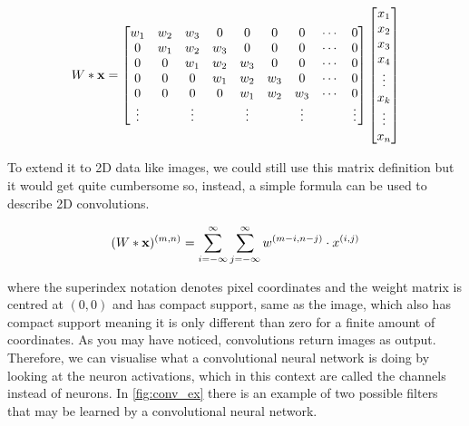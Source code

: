 \begin{equation}
    W * {\mathbf x} = \begin{bmatrix}
        w_1 & w_2  & w_3  & 0 & 0 & 0 & 0&\cdots  &0\\
        0 & w_1  & w_2 & w_3  & 0&0&0&\cdots &0\\
        0 & 0 & w_1 & w_2  & w_3  & 0&0&\cdots &0\\
        0 & 0 & 0& w_1  & w_2  &w_3 &0&\cdots &0\\
        0 & 0 & 0& 0 & w_1  &w_2 &w_3 &\cdots &0\\
        \vdots&&\vdots&&\vdots&&\vdots&&\vdots
    \end{bmatrix}
    \begin{bmatrix}
        x_1\\
        x_2\\
        x_3\\
        x_4\\
        \vdots\\
        x_k\\
        \vdots\\
        x_n
    \end{bmatrix}
\end{equation}

To extend it to 2D data like images, we could still use this matrix definition but it would get quite cumbersome so, instead, a simple formula can be used to describe 2D convolutions.

\begin{equation}
    (W * {\mathbf x}) ^{(m,n)} = \sum_{i=-\infty}^{\infty} \sum_{j=-\infty}^{\infty} w^{(m-i, n-j)} \cdot x^{(i,j)}
\end{equation}

\noindent where the superindex notation denotes pixel coordinates and the weight matrix is centred at $(0,0)$ and has compact support, same as the image, which also has compact support meaning it is only different than zero for a finite amount of coordinates. As you may have noticed, convolutions return images as output. Therefore, we can visualise what a convolutional neural network is doing by looking at the neuron activations, which in this context are called the channels instead of neurons. In \autoref{fig:conv_ex} there is an example of two possible filters that may be learned by a convolutional neural network.

